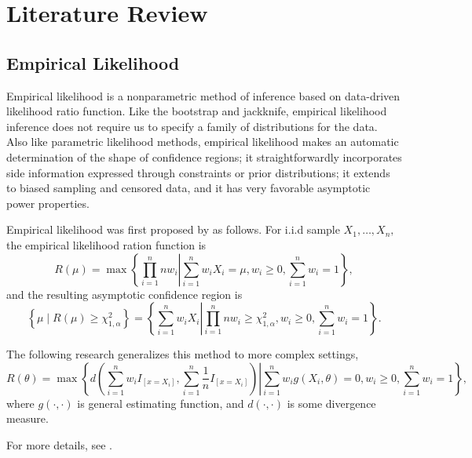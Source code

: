 \chapter{Literature Review}

\section{Empirical Likelihood}

Empirical likelihood is a nonparametric method of inference based
on data-driven likelihood ratio function. Like the bootstrap and jackknife,
empirical likelihood inference does not require us to specify a family
of distributions for the data. 
Also like parametric likelihood methods,
empirical likelihood makes an automatic determination of the shape
of confidence regions; it straightforwardly incorporates side information
expressed through constraints or prior distributions; it extends to
biased sampling and censored data, and it has very favorable asymptotic
power properties.

Empirical likelihood was first proposed by \citet{owen1988empirical}
as follows. For i.i.d sample $X_{1},\ldots,X_{n},$ the empirical
likelihood ration function is 
\[
R\left(\mu\right)=\max\left\{ \left.\prod_{i=1}^{n}nw_{i}\right|\sum_{i=1}^{n}w_{i}X_{i}=\mu,w_{i}\ge0,\sum_{i=1}^{n}w_{i}=1\right\} ,
\]
and the resulting asymptotic confidence region is 
\begin{equation}
\left\{ \mu\mid R\left(\mu\right)\ge\chi_{1,\alpha}^{2}\right\} =\left\{ \left.\sum_{i=1}^{n}w_{i}X_{i}\right|\prod_{i=1}^{n}nw_{i}\ge\chi_{1,\alpha}^{2},w_{i}\ge0,\sum_{i=1}^{n}w_{i}=1\right\} .\label{eq:ci-original-el}
\end{equation}
\begin{comment}
rubin 1981 bayesian bootstrap in wu changbao. ? lit review asymp exp
obj prior. 
\end{comment}
The following research generalizes this method to more complex settings,
\[
R\left(\theta\right)=\max\left\{ \left.d\left(\sum_{i=1}^{n}w_{i}I_{\left[x=X_{i}\right]},\sum_{i=1}^{n}\frac{1}{n}I_{\left[x=X_{i}\right]}\right)\right|\sum_{i=1}^{n}w_{i}g\left(X_{i},\theta\right)=0,w_{i}\ge0,\sum_{i=1}^{n}w_{i}=1\right\} ,
\]
where $g\left(\cdot,\cdot\right)$ is general estimating function,
and $d\left(\cdot,\cdot\right)$ is some divergence measure.%
\begin{comment}
prob cov ch2 ch3
\end{comment}
{} For more details, see \citet{owen2010empirical}.


